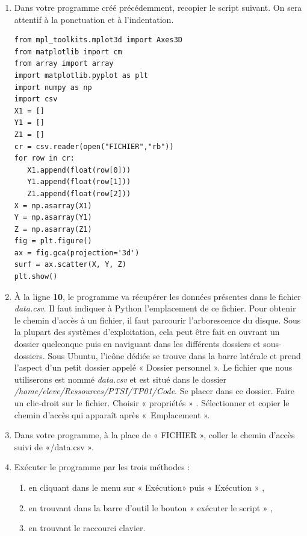 \begin{exercice}

\begin{enumerate}
\item Dans votre programme cr\' e\' e pr\' ec\' edemment, recopier le script suivant. On sera attentif \` a la ponctuation et \` a l'indentation.

\begin{verbatim}
from mpl_toolkits.mplot3d import Axes3D
from matplotlib import cm
from array import array   
import matplotlib.pyplot as plt   
import numpy as np   
import csv   
X1 = []   
Y1 = []   
Z1 = []   
cr = csv.reader(open("FICHIER","rb"))   
for row in cr:   
   X1.append(float(row[0]))
   Y1.append(float(row[1]))  
   Z1.append(float(row[2]))
X = np.asarray(X1)   
Y = np.asarray(Y1)   
Z = np.asarray(Z1)   
fig = plt.figure()   
ax = fig.gca(projection='3d')   
surf = ax.scatter(X, Y, Z)   
plt.show()
\end{verbatim}

\item À la ligne \textbf{10}, le programme va r\' ecup\' erer les donn\' ees pr\' esentes dans le fichier \textit{data.csv}. Il faut indiquer \` a Python l'emplacement de ce fichier. Pour obtenir le chemin d'acc\` es \` a un fichier, il faut parcourir l'arborescence du disque. Sous la plupart des syst\` emes d'exploitation, cela peut \^ etre fait en ouvrant un dossier quelconque puis en naviguant dans les diff\' erents dossiers et sous-dossiers. Sous Ubuntu, l'ic\^ one d\' edi\' ee se trouve dans la barre lat\' erale et prend l'aspect d'un petit dossier appel\' e « Dossier personnel ». Le fichier que nous utiliserons est nomm\' e \textit{data.csv} et est situ\' e dans le dossier \textit{/home/eleve/Ressources/PTSI/TP01/Code}. Se placer dans ce dossier. Faire un clic-droit sur le fichier. Choisir « propri\' et\' es » . S\' electionner et copier le chemin d'acc\` es qui appara\^ it apr\` es «~Emplacement ».
\item Dans votre programme, \` a la place de « FICHIER », coller le chemin d'acc\` es suivi de «/data.csv ».
\item Ex\' ecuter le programme par les trois m\' ethodes :
\begin{enumerate}
\item en cliquant dans le menu sur « Ex\' ecution»  puis « Ex\' ecution » ,
\item en trouvant dans la barre d'outil le bouton « ex\' ecuter le script » ,
\item en trouvant le raccourci clavier.
\end{enumerate}
\end{enumerate}
\end{exercice}

